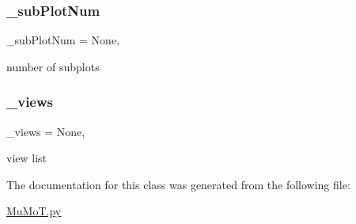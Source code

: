 \subsubsection{\texorpdfstring{\+\_\+sub\+Plot\+Num}{\_subPlotNum}}
{\footnotesize\ttfamily \+\_\+sub\+Plot\+Num = None\hspace{0.3cm}{\ttfamily [static]}, {\ttfamily [private]}}



number of subplots 

\mbox{\label{class_mu_mo_t_1_1_mu_mo_tmulti_view_af533f289cf818694f54ab8bd57083537}} 
\subsubsection{\texorpdfstring{\+\_\+views}{\_views}}
{\footnotesize\ttfamily \+\_\+views = None\hspace{0.3cm}{\ttfamily [static]}, {\ttfamily [private]}}



view list 



The documentation for this class was generated from the following file\+:\begin{DoxyCompactItemize}
\item 
\hyperlink{_mu_mo_t_8py}{Mu\+Mo\+T.\+py}\end{DoxyCompactItemize}
